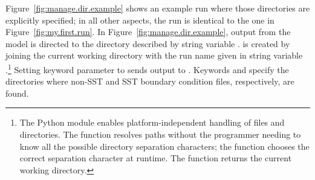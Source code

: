\begin{htmlonly}
\label{fig:manage.dir.example}
\begin{center}

\end{center}
\end{htmlonly}


Figure~\ref{fig:manage.dir.example} shows an example run where those
directories are explicitly specified; in all other aspects, the run
is identical to the one in Figure~\ref{fig:my.first.run}.
In Figure~\ref{fig:manage.dir.example}, output from the model is
directed to the directory described by string variable
.   is created by joining the
current working directory with the run name given in string variable
.\footnote%
	{The Python  module enables platform-independent
	handling of files and directories.  The 
	function resolves paths without the programmer needing to know
	all the possible directory separation characters; the function
	chooses the correct separation character at runtime.  The
	 function returns the current working directory.}
Setting keyword parameter  to  sends
output to .  
Keywords  and  specify the directories
where non-SST and SST boundary condition files, respectively, are
found.

